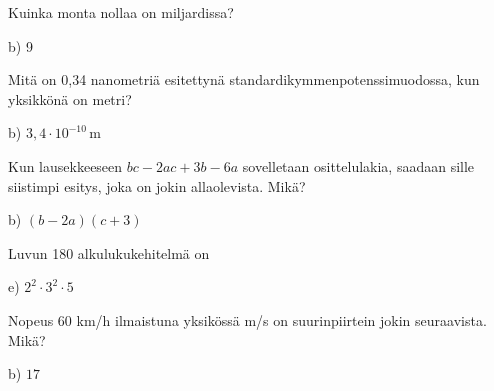 \begin{tehtava}
Kuinka monta nollaa on miljardissa?
\begin{alakohdat}
\end{alakohdat}
\begin{vastaus}
b) 9
\end{vastaus}
\end{tehtava}

\begin{tehtava}
Mitä on 0,34 nanometriä esitettynä standardikymmenpotenssimuodossa, kun yksikkönä on metri?
\begin{alakohdat}
\end{alakohdat}
\begin{vastaus}
b) $3,4 \cdot 10^{-10}$\,m
\end{vastaus}
\end{tehtava}

\begin{tehtava}
Kun lausekkeeseen $bc-2ac+3b-6a$ sovelletaan osittelulakia, saadaan sille siistimpi esitys, joka on jokin allaolevista. Mikä?
	\begin{alakohdat}
	\end{alakohdat}
    \begin{vastaus}
	b) $(b-2a)(c+3)$
    \end{vastaus}
\end{tehtava}

\begin{tehtava}
Luvun 180 alkulukukehitelmä on
\begin{alakohdat}
\end{alakohdat}
	\begin{vastaus}
	 e) $2^2\cdot3^2\cdot5$
	\end{vastaus}
\end{tehtava}

\begin{tehtava}
Nopeus 60 km/h ilmaistuna yksikössä m/s on suurinpiirtein jokin seuraavista. Mikä?
\begin{alakohdat}
\end{alakohdat}
	\begin{vastaus}
	 b) $17$
	\end{vastaus}
\end{tehtava}


